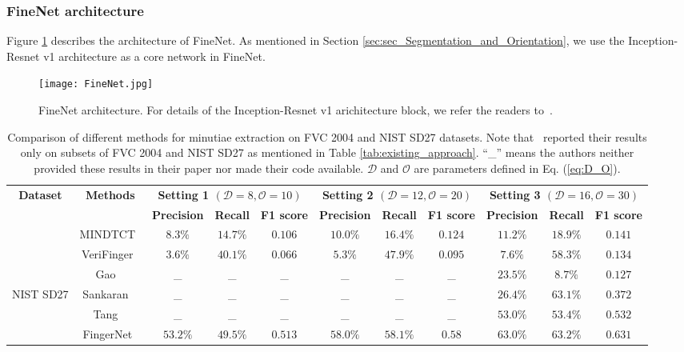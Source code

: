 \documentclass[10pt,twocolumn,letterpaper]{article}
\begin{document}
\subsubsection{FineNet architecture}
\label{sec:subsec_FineNet_architecture}
Figure \ref{fig:FineNet} describes the architecture of FineNet. As mentioned in Section \ref{sec:sec_Segmentation_and_Orientation}, we use the Inception-Resnet v1 architecture as a core network in FineNet. 

\begin{figure}[!bp]
\centering
\texttt{[image: FineNet.jpg]}
\caption{FineNet architecture. For details of the Inception-Resnet v1 arichitecture block, we refer the readers to~\cite{szegedy2017inception}.}
\label{fig:FineNet}
\end{figure}

\begin{table*}[!tbhp]
	\centering
	\caption{Comparison of different methods for minutiae extraction on FVC 2004 and NIST SD27 datasets. Note that~\cite{sankaran2014latent, tang2017CNN} reported their results only on subsets of FVC 2004 and NIST SD27 as mentioned in Table \ref{tab:existing_approach}. ``\_'' means the authors neither provided these results in their paper nor made their code available. $\mathcal{D}$ and $\mathcal{O}$ are parameters defined in Eq. (\ref{eq:D_O}).}    
	\label{tab:compare_configuration}
	\begin{small}
		\begin{adjustbox}{max width=\textwidth}
		\begin{tabular}{|c|c|c|c|c|c|c|c|c|c|c|}
			\hline{\bfseries Dataset}&{\bfseries Methods}& \multicolumn{3}{c|}{\bfseries Setting 1 $(\mathcal{D}=8,\mathcal{O}=10)$}& \multicolumn{3}{c|}{\bfseries Setting 2 $(\mathcal{D}=12,\mathcal{O}=20)$}&\multicolumn{3}{c|}{\bfseries Setting 3 $(\mathcal{D}=16,\mathcal{O}=30)$}\\
			\cline{3-11}
			&{}&{\bfseries Precision}& {\bfseries Recall}& {\bfseries F1 score}&{\bfseries Precision}& {\bfseries Recall}& {\bfseries F1 score}& {\bfseries Precision}& {\bfseries Recall}& {\bfseries F1 score}\\
			\hline{}&{MINDTCT~\cite{ko2007user}}&$8.3\%$&$14.7\%$&$0.106$&$10.0\%$&$16.4\%$&$0.124$&$11.2\%$&$18.9\%$&$0.141$\\{}&{VeriFinger~\cite{verifinger2010neuro}}&$3.6\%$&$40.1\%$&$0.066$&$5.3\%$&$47.9\%$&$0.095$&$7.6\%$&$58.3\%$&$0.134$\\{}&{Gao \etal~\cite{gao2010novel}}&\_ &\_ &\_ &\_ &\_ &\_ &$23.5\%$&$8.7\%$&$0.127$\\{NIST SD27}&{Sankaran \etal~\cite{sankaran2014latent}}&\_ &\_ &\_ &\_ &\_ &\_ &$26.4\%$&$63.1\%$&$0.372$\\{}&{Tang \etal~\cite{tang2017CNN}}&\_ &\_ &\_ &\_ &\_ &\_ &$53.0\%$&$53.4\%$&$0.532$\\{}&{FingerNet~\cite{tang2017FingerNet}}&$53.2\%$&$49.5\%$&$0.513$&$58.0\%$&$58.1\%$&$0.58$&$63.0\%$&$63.2\%$&$0.631$\\

\end{tabular}
\end{adjustbox}
\end{small}
\end{table*}
\end{document}
